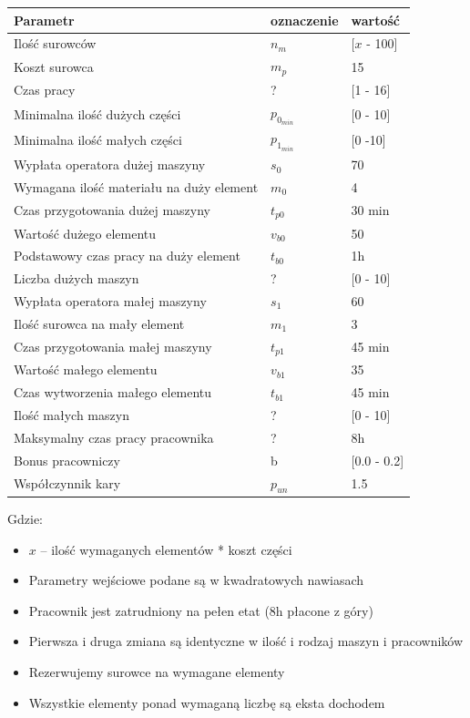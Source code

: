 \documentclass[a4paper]{article}
\begin{document}
\begin{longtable}[c]{lll}
Parametr & oznaczenie & wartość\\ \hline
Ilość surowców & $n_m$ & [$x$ - 100]\\
Koszt surowca & $m_p$ & 15\\
Czas pracy & ? & {[}1 - 16{]}\\
Minimalna ilość dużych części & $p_{0_{min}}$ & [0 - 10]\\
Minimalna ilość małych części & $p_{1_{min}}$ & [0 -10]\\
Wypłata operatora dużej maszyny & $s_0$ & 70\\
Wymagana ilość materiału na duży element & $m_0$ & 4\\
Czas przygotowania dużej maszyny & $t_{p0}$ & 30 min\\
Wartość dużego elementu & $v_{b0}$ & 50\\
Podstawowy czas pracy na duży element & $t_{b0}$ & 1h\\
Liczba dużych maszyn & ? & [0 - 10]\\
Wypłata operatora małej maszyny & $s_1$ & 60\\
Ilość surowca na mały element & $m_1$ & 3\\
Czas przygotowania małej maszyny & $t_{p1}$ & 45 min\\
Wartość małego elementu & $v_{b1}$ & 35\\
Czas wytworzenia małego elementu & $t_{b1}$ & 45 min\\
Ilość małych maszyn & ? & [0 - 10]\\
Maksymalny czas pracy pracownika & ? & 8h\\
Bonus pracowniczy & b & [0.0 - 0.2]\\
Współczynnik kary & $p_{un}$ & 1.5
\end{longtable}

Gdzie:
\begin{itemize}
    \item $x$ -- ilość wymaganych elementów * koszt części 
    \item Parametry wejściowe podane są w kwadratowych nawiasach
    \item Pracownik jest zatrudniony na pełen etat (8h płacone z góry)
    \item Pierwsza i druga zmiana są identyczne w ilość i rodzaj maszyn i pracowników
    \item Rezerwujemy surowce na wymagane elementy
    \item Wszystkie elementy ponad wymaganą liczbę są eksta dochodem
\end{itemize}
\end{document}
